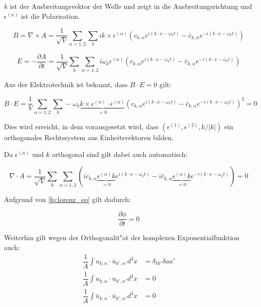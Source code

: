 $k$ ist der Ausbreitungsvektor der Welle und zeigt in die Ausbreitungsrichtung und $\epsilon^{(\alpha)}$ ist die Polarisation. 

\begin{equation*}
B = \nabla \times A = \frac{1}{ \sqrt{V}} \sum_{\alpha=1,2}  \sum_k ik \times \epsilon^{(\alpha)} \left(c_{k,\alpha} e^{i (k \cdot x - \omega_k t)} - \bar{c}_{k,\alpha} e^{-i(k \cdot x - \omega_k t)} \right)
\end{equation*}

\begin{equation*}
E = - \frac{\partial A}{\partial t} = \frac{1}{\sqrt{V}} \sum_k \sum_{\alpha=1,2} i \omega_k \epsilon^{(\alpha)} \left(c_{k,\alpha} e^{i (k \cdot x - \omega_k t)} - \bar{c}_{k,\alpha} e^{-i(k \cdot x - \omega_k t)} \right)
\end{equation*}

Aus der Elektrotechnik ist bekannt, dass $B \cdot E = 0$ gilt:

\begin{equation*}
B \cdot E = \frac{1}{V} \sum_{\alpha=1,2}   \sum_k -\omega_k \underbrace{k \times  \epsilon^{(\alpha)} \cdot \epsilon^{(\alpha)}}_{=0} \left(c_{k,\alpha} e^{i (k \cdot x - \omega_k t)} - \bar{c}_{k,\alpha} e^{-i(k \cdot x - \omega_k t)}\right)^2 = 0
\end{equation*}

Dies wird erreicht, in dem vorausgesetzt wird, dass $(\epsilon^{(1)}, \epsilon^{(2)} , k/|k|)$ ein orthogonales Rechtssystem aus Einheitsvektoren bilden.

Da $\epsilon^{(\alpha)}$ und $k$ orthogonal sind gilt dabei auch automatisch:

\begin{equation*}
\nabla \cdot A = \frac{1}{\sqrt{V}} \sum_k \sum_{\alpha=1,2} \left(i c_{k,\alpha} \underbrace{\epsilon^{(\alpha)} k}_{=0} e^{i (k \cdot x - \omega_k t)} - i \bar{c}_{k,\alpha} \underbrace{\epsilon^{(\alpha)} k}_{=0} e^{-i(k \cdot x - \omega_k t)}\right) = 0
\end{equation*}

Aufgrund von \ref{fq:lorenz_eq} gilt dadurch:

\begin{equation*}
\frac{\partial \phi }{\partial t} = 0
\end{equation*}

Weiterhin gilt wegen der Orthogonalit"at der komplexen Exponentialfunktion auch:
\begin{align*}
\dfrac{1}{A} \int u_{k,\alpha} \cdot \bar{u}_{k',\alpha'} d^3 x &= \delta_{kk'}\delta{aa'} \\
\dfrac{1}{A} \int u_{k,\alpha} \cdot u_{k',\alpha'} d^3 x &= 0 \\
\dfrac{1}{A} \int \bar{u}_{k,\alpha} \cdot \bar{u}_{k',\alpha'} d^3 x &= 0
\end{align*}

